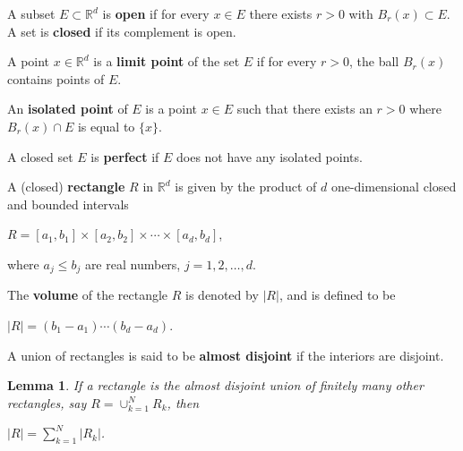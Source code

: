 \documentclass{book}
\newcommand{\RR}{\mathbb R}
\newtheorem{lemma}[theorem]{Lemma}
\begin{document}
A subset $E\subset\RR^d$ is \textbf{open} if for every $x\in E$ there exists $r>0$ with $B_r(x)\subset E$. A set is \textbf{closed} if its complement is open.

A point $x\in\RR^d$ is a \textbf{limit point} of the set $E$ if for every $r>0$, the ball $B_r(x)$ contains points of $E$.

An \textbf{isolated point} of $E$ is a point $x\in E$ such that there exists an $r>0$ where $B_r(x)\cap E$ is equal to $\{x\}$.

A closed set $E$ is \textbf{perfect} if $E$ does not have any isolated points.

A (closed) \textbf{rectangle} $R$ in $\RR^d$ is given by the product of $d$ one-dimensional closed and bounded intervals
\begin{center}
    $R=[a_1,b_1]\times [a_2,b_2]\times\cdots\times[a_d,b_d]$,
\end{center}
where $a_j\leq b_j$ are real numbers, $j=1,2,\dots,d$.

The \textbf{volume} of the rectangle $R$ is denoted by $|R|$, and is defined to be
\begin{center}
    $|R|=(b_1-a_1)\cdots(b_d-a_d)$.
\end{center}
A union of rectangles is said to be \textbf{almost disjoint} if the interiors are disjoint.
\begin{lemma}
    If a rectangle is the almost disjoint union of finitely many other rectangles, say $R=\cup_{k=1}^N R_k$, then
    \begin{center}
        $|R|=\sum_{k=1}^{N} |R_k|$.
    \end{center}
\end{lemma}
\end{document}
